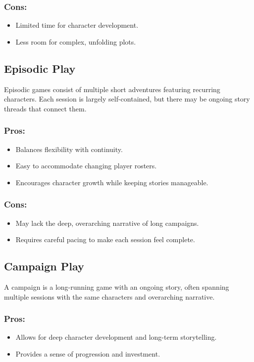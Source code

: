 \subsubsection{Cons:}
\begin{itemize}
    \item Limited time for character development.
    \item Less room for complex, unfolding plots.
\end{itemize}

\subsection{Episodic Play}
Episodic games consist of multiple short adventures featuring recurring characters. Each session is largely self-contained, but there may be ongoing story threads that connect them.

\subsubsection{Pros:}
\begin{itemize}
    \item Balances flexibility with continuity.
    \item Easy to accommodate changing player rosters.
    \item Encourages character growth while keeping stories manageable.
\end{itemize}

\subsubsection{Cons:}
\begin{itemize}
    \item May lack the deep, overarching narrative of long campaigns.
    \item Requires careful pacing to make each session feel complete.
\end{itemize}

\subsection{Campaign Play}
A campaign is a long-running game with an ongoing story, often spanning multiple sessions with the same characters and overarching narrative.

\subsubsection{Pros:}
\begin{itemize}
    \item Allows for deep character development and long-term storytelling.
    \item Provides a sense of progression and investment.
\end{itemize}

